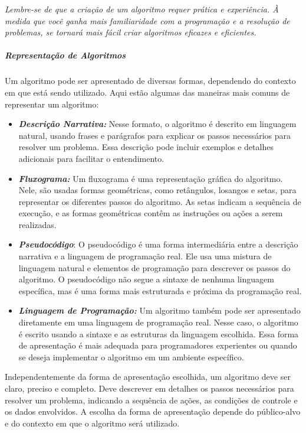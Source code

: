 \documentclass[a4paper, 12pt, onecolumn,singlespacing]{article}
\begin{document}
	
	\textit{Lembre-se de que a criação de um algoritmo requer prática e experiência. À medida que você ganha mais familiaridade com a programação e a resolução de problemas, se tornará mais fácil criar algoritmos eficazes e eficientes.}
	
	\subparagraph{Representação de Algoritmos}
	\label{representacao_de_algoritmos}
	
	Um algoritmo pode ser apresentado de diversas formas, dependendo do contexto em que está sendo utilizado. Aqui estão algumas das maneiras mais comuns de representar um algoritmo:
	
	\begin{itemize}
		\item \textbf{\textit{Descrição Narrativa:}} Nesse formato, o algoritmo é descrito em linguagem natural, usando frases e parágrafos para explicar os passos necessários para resolver um problema. Essa descrição pode incluir exemplos e detalhes adicionais para facilitar o entendimento.
		
		\item \textbf{\textit{Fluxograma:}} Um fluxograma é uma representação gráfica do algoritmo. Nele, são usadas formas geométricas, como retângulos, losangos e setas, para representar os diferentes passos do algoritmo. As setas indicam a sequência de execução, e as formas geométricas contêm as instruções ou ações a serem realizadas.
		
		\item \textbf{\textit{Pseudocódigo}}: O pseudocódigo é uma forma intermediária entre a descrição narrativa e a linguagem de programação real. Ele usa uma mistura de linguagem natural e elementos de programação para descrever os passos do algoritmo. O pseudocódigo não segue a sintaxe de nenhuma linguagem específica, mas é uma forma mais estruturada e próxima da programação real.
		
		\item \textbf{\textit{Linguagem de Programação:}} Um algoritmo também pode ser apresentado diretamente em uma linguagem de programação real. Nesse caso, o algoritmo é escrito usando a sintaxe e as estruturas da linguagem escolhida. Essa forma de apresentação é mais adequada para programadores experientes ou quando se deseja implementar o algoritmo em um ambiente específico.
		
	\end{itemize}
	
	Independentemente da forma de apresentação escolhida, um algoritmo deve ser claro, preciso e completo. Deve descrever em detalhes os passos necessários para resolver um problema, indicando a sequência de ações, as condições de controle e os dados envolvidos. A escolha da forma de apresentação depende do público-alvo e do contexto em que o algoritmo será utilizado.
	
\end{document}
